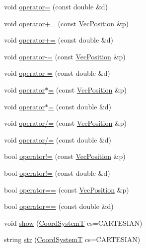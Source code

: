 \begin{DoxyCompactItemize}
\item 
void \hyperlink{classVecPosition_af80e8792b5484c9cf98b459419976068}{operator=} (const double \&d)
\item 
void \hyperlink{classVecPosition_a83a2cb6b2b857470a55931fd87343367}{operator+=} (const \hyperlink{classVecPosition}{Vec\+Position} \&p)
\item 
void \hyperlink{classVecPosition_af27eabf2688269dee73c5a0bdb7273da}{operator+=} (const double \&d)
\item 
void \hyperlink{classVecPosition_ad8805f349b84e3174331dde3622d5bce}{operator-\/=} (const \hyperlink{classVecPosition}{Vec\+Position} \&p)
\item 
void \hyperlink{classVecPosition_a996e121956739bfde32df19b5af990f1}{operator-\/=} (const double \&d)
\item 
void \hyperlink{classVecPosition_a9adc66206cf877ce49c3d47058e05491}{operator$\ast$=} (const \hyperlink{classVecPosition}{Vec\+Position} \&p)
\item 
void \hyperlink{classVecPosition_a4bf399fd9487d4014f8b5722dbb34daa}{operator$\ast$=} (const double \&d)
\item 
void \hyperlink{classVecPosition_a27d6eb6deca0491c305f16046255eaab}{operator/=} (const \hyperlink{classVecPosition}{Vec\+Position} \&p)
\item 
void \hyperlink{classVecPosition_aedb19cc879d40d2c87057fcf7140e7ca}{operator/=} (const double \&d)
\item 
bool \hyperlink{classVecPosition_aeec749f6cd497d25ce84f71fa66826f1}{operator!=} (const \hyperlink{classVecPosition}{Vec\+Position} \&p)
\item 
bool \hyperlink{classVecPosition_a0248fae27af5c8a583510e61f22f3697}{operator!=} (const double \&d)
\item 
bool \hyperlink{classVecPosition_a8e096f2750d0357dca4a859a3c3a38f0}{operator==} (const \hyperlink{classVecPosition}{Vec\+Position} \&p)
\item 
bool \hyperlink{classVecPosition_adbbfa6233da6830d1ce7259b1cb3b5cc}{operator==} (const double \&d)
\item 
void \hyperlink{classVecPosition_a3b57fc3270c3806f0ce73112d13fe9d0}{show} (\hyperlink{Geometry_8h_af3e194d00b468bcd9641c4d3576a0624}{Coord\+SystemT} cs=C\+A\+R\+T\+E\+S\+I\+AN)
\item 
string \hyperlink{classVecPosition_ae824c5b377300982555c31daefc3f489}{str} (\hyperlink{Geometry_8h_af3e194d00b468bcd9641c4d3576a0624}{Coord\+SystemT} cs=C\+A\+R\+T\+E\+S\+I\+AN)
\item 

\end{DoxyCompactItemize}
